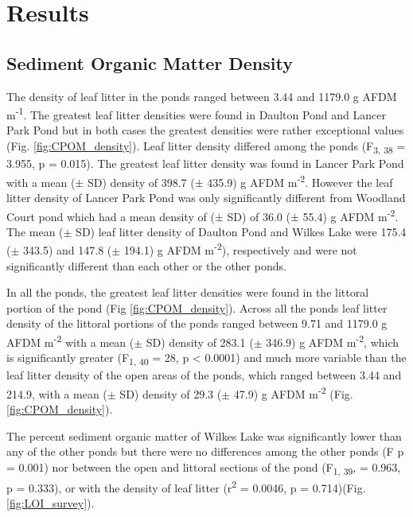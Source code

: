 \section{Results}
\subsection{Sediment Organic Matter Density}

The density of leaf litter in the ponds ranged between 3.44 and 1179.0 g AFDM m\textsuperscript{-1}. The greatest leaf litter densities were found in Daulton Pond and Lancer Park Pond but in both cases the greatest densities were rather exceptional values (Fig. \ref{fig:CPOM_density}). Leaf litter density differed among the ponds (F\textsubscript{3, 38} = 3.955, p = 0.015). The greatest leaf litter density was found in Lancer Park Pond with a mean ($\pm$ SD) density of 398.7 ($\pm$ 435.9) g AFDM m\textsuperscript{-2}. However the leaf litter density of Lancer Park Pond was only significantly different from Woodland Court pond which had a mean density of ($\pm$ SD) of 36.0 ($\pm$ 55.4) g AFDM m\textsuperscript{-2}. The mean ($\pm$ SD) leaf litter density of Daulton Pond and Wilkes Lake were 175.4 ($\pm$ 343.5) and 147.8 ($\pm$ 194.1) g AFDM m\textsuperscript{-2}), respectively and were not significantly different than each other or the other ponds. 

In all the ponds, the greatest leaf litter densities were found in the littoral portion of the pond (Fig \ref{fig:CPOM_density}). Across all the ponds leaf litter density of the littoral portions of the ponds ranged between 9.71 and 1179.0 g AFDM m\textsuperscript{-2} with a mean ($\pm$ SD) density of 283.1 ($\pm$ 346.9) g AFDM m\textsuperscript{-2}, which is significantly greater (F\textsubscript{1, 40} = 28, p < 0.0001) and much more variable than the leaf litter density of the open areas of the ponds, which ranged between 3.44 and 214.9, with a mean ($\pm$ SD) density of 29.3 ($\pm$ 47.9) g AFDM m\textsuperscript{-2} (Fig. \ref{fig:CPOM_density}). 

The percent sediment organic matter of Wilkes Lake was significantly lower than any of the other ponds but there were no differences among the other ponds (F p = 0.001) nor between the open and littoral sections of the pond (F\textsubscript{1, 39}, = 0.963, p = 0.333), or with the density of leaf litter (r\textsuperscript{2} = 0.0046, p = 0.714)(Fig. \ref{fig:LOI_survey}). 

  

  

